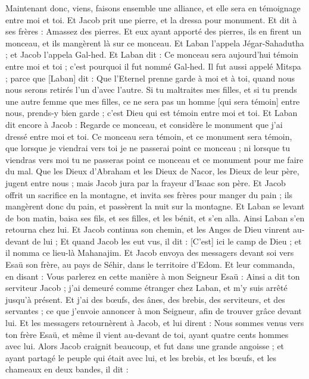 \begin{multicols}{2}
Maintenant donc, viens, faisons ensemble une alliance, et elle sera en témoignage entre moi et toi.
Et Jacob prit une pierre, et la dressa pour monument.
Et dit à ses frères : Amassez des pierres. Et eux ayant apporté des pierres, ils en firent un monceau, et ils mangèrent là sur ce monceau.
Et Laban l'appela Jégar-Sahadutha ; et Jacob l'appela Gal-hed.
Et Laban dit : Ce monceau sera aujourd'hui témoin entre moi et toi ; c'est pourquoi il fut nommé Gal-hed.
Il fut aussi appelé Mitspa ; parce que [Laban] dit : Que l'Eternel prenne garde à moi et à toi, quand nous nous serons retirés l'un d'avec l'autre.
Si tu maltraites mes filles, et si tu prends une autre femme que mes filles, ce ne sera pas un homme [qui sera témoin] entre nous, prends-y bien garde ; c'est Dieu qui est témoin entre moi et toi.
Et Laban dit encore à Jacob : Regarde ce monceau, et considère le monument que j'ai dressé entre moi et toi.
Ce monceau sera témoin, et ce monument sera témoin, que lorsque je viendrai vers toi je ne passerai point ce monceau ; ni lorsque tu viendras vers moi tu ne passeras point ce monceau et ce monument pour me faire du mal.
Que les Dieux d'Abraham et les Dieux de Nacor, les Dieux de leur père, jugent entre nous ; mais Jacob jura par la frayeur d'Isaac son père.
Et Jacob offrit un sacrifice en la montagne, et invita ses frères pour manger du pain ; ils mangèrent donc du pain, et passèrent la nuit sur la montagne.
Et Laban se levant de bon matin, baisa ses fils, et ses filles, et les bénit, et s'en alla. Ainsi Laban s'en retourna chez lui.
\VerseOne{}Et Jacob continua son chemin, et les Anges de Dieu vinrent au-devant de lui ;
Et quand Jacob les eut vus, il dit : [C'est] ici le camp de Dieu ; et il nomma ce lieu-là Mahanajim.
Et Jacob envoya des messagers devant soi vers Esaü son frère, au pays de Séhir, dans le territoire d'Edom.
Et leur commanda, en disant : Vous parlerez en cette manière à mon Seigneur Esaü : Ainsi a dit ton serviteur Jacob ; j'ai demeuré comme étranger chez Laban, et m'y suis arrêté jusqu'à présent.
Et j'ai des bœufs, des ânes, des brebis, des serviteurs, et des servantes ; ce que j'envoie annoncer à mon Seigneur, afin de trouver grâce devant lui.
Et les messagers retournèrent à Jacob, et lui dirent : Nous sommes venus vers ton frère Esaü, et même il vient au-devant de toi, ayant quatre cents hommes avec lui.
Alors Jacob craignit beaucoup, et fut dans une grande angoisse ; et ayant partagé le peuple qui était avec lui, et les brebis, et les bœufs, et les chameaux en deux bandes, il dit :

\end{multicols}
